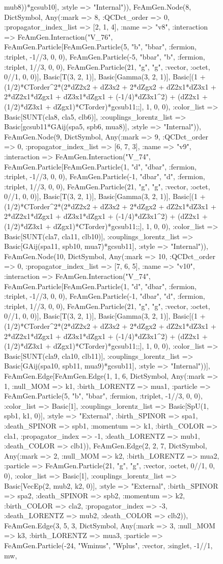 \documentclass{revtex4}
\begin{document}
\begin{figure}[!htb]
\begin{center}
{mub8))*gcsub10], :style => "Internal")), FeAmGen.Node(8, Dict{Symbol, Any}(:mark => 8, :QCDct_order => 0, :propagator_index_list => [2, 1, 4], :name => "v8", :interaction => FeAmGen.Interaction("V_76", FeAmGen.Particle[FeAmGen.Particle(5, "b", "bbar", :fermion, :triplet, -1//3, 0, 0), FeAmGen.Particle(-5, "bbar", "b", :fermion, :triplet, 1//3, 0, 0), FeAmGen.Particle(21, "g", "g", :vector, :octet, 0//1, 0, 0)], Basic[T(3, 2, 1)], Basic[Gamma(3, 2, 1)], Basic[(1 + (1/2)*CTorder^2*(2*dZ2x2 + dZ3x2 + 2*dZgx2 + dZ2x1*dZ3x1 + 2*dZ2x1*dZgx1 + dZ3x1*dZgx1 + (-1/4)*dZ3x1^2) + (dZ2x1 + (1/2)*dZ3x1 + dZgx1)*CTorder)*gcsub11;;], 1, 0, 0), :color_list => Basic[SUNT(cla8, cla5, clb6)], :couplings_lorentz_list => Basic[gcsub11*GAij(spa5, spb6, mua8)], :style => "Internal")), FeAmGen.Node(9, Dict{Symbol, Any}(:mark => 9, :QCDct_order => 0, :propagator_index_list => [6, 7, 3], :name => "v9", :interaction => FeAmGen.Interaction("V_74", FeAmGen.Particle[FeAmGen.Particle(1, "d", "dbar", :fermion, :triplet, -1//3, 0, 0), FeAmGen.Particle(-1, "dbar", "d", :fermion, :triplet, 1//3, 0, 0), FeAmGen.Particle(21, "g", "g", :vector, :octet, 0//1, 0, 0)], Basic[T(3, 2, 1)], Basic[Gamma(3, 2, 1)], Basic[(1 + (1/2)*CTorder^2*(2*dZ2x2 + dZ3x2 + 2*dZgx2 + dZ2x1*dZ3x1 + 2*dZ2x1*dZgx1 + dZ3x1*dZgx1 + (-1/4)*dZ3x1^2) + (dZ2x1 + (1/2)*dZ3x1 + dZgx1)*CTorder)*gcsub11;;], 1, 0, 0), :color_list => Basic[SUNT(cla7, cla11, clb10)], :couplings_lorentz_list => Basic[GAij(spa11, spb10, mua7)*gcsub11], :style => "Internal")), FeAmGen.Node(10, Dict{Symbol, Any}(:mark => 10, :QCDct_order => 0, :propagator_index_list => [7, 6, 5], :name => "v10", :interaction => FeAmGen.Interaction("V_74", FeAmGen.Particle[FeAmGen.Particle(1, "d", "dbar", :fermion, :triplet, -1//3, 0, 0), FeAmGen.Particle(-1, "dbar", "d", :fermion, :triplet, 1//3, 0, 0), FeAmGen.Particle(21, "g", "g", :vector, :octet, 0//1, 0, 0)], Basic[T(3, 2, 1)], Basic[Gamma(3, 2, 1)], Basic[(1 + (1/2)*CTorder^2*(2*dZ2x2 + dZ3x2 + 2*dZgx2 + dZ2x1*dZ3x1 + 2*dZ2x1*dZgx1 + dZ3x1*dZgx1 + (-1/4)*dZ3x1^2) + (dZ2x1 + (1/2)*dZ3x1 + dZgx1)*CTorder)*gcsub11;;], 1, 0, 0), :color_list => Basic[SUNT(cla9, cla10, clb11)], :couplings_lorentz_list => Basic[GAij(spa10, spb11, mua9)*gcsub11], :style => "Internal"))], FeAmGen.Edge[FeAmGen.Edge(1, 1, 6, Dict{Symbol, Any}(:mark => 1, :null_MOM => k1, :birth_LORENTZ => mua1, :particle => FeAmGen.Particle(5, "b", "bbar", :fermion, :triplet, -1//3, 0, 0), :color_list => Basic[1], :couplings_lorentz_list => Basic[SpU(1, spb1, k1, 0)], :style => "External", :birth_SPINOR => spa1, :death_SPINOR => spb1, :momentum => k1, :birth_COLOR => cla1, :propagator_index => -1, :death_LORENTZ => mub1, :death_COLOR => clb1)), FeAmGen.Edge(2, 2, 7, Dict{Symbol, Any}(:mark => 2, :null_MOM => k2, :birth_LORENTZ => mua2, :particle => FeAmGen.Particle(21, "g", "g", :vector, :octet, 0//1, 0, 0), :color_list => Basic[1], :couplings_lorentz_list => Basic[VecEp(2, mub2, k2, 0)], :style => "External", :birth_SPINOR => spa2, :death_SPINOR => spb2, :momentum => k2, :birth_COLOR => cla2, :propagator_index => -3, :death_LORENTZ => mub2, :death_COLOR => clb2)), FeAmGen.Edge(3, 5, 3, Dict{Symbol, Any}(:mark => 3, :null_MOM => k3, :birth_LORENTZ => mua3, :particle => FeAmGen.Particle(-24, "Wminus", "Wplus", :vector, :singlet, -1//1, mw, }
\end{center}
\end{figure}
\end{document}
